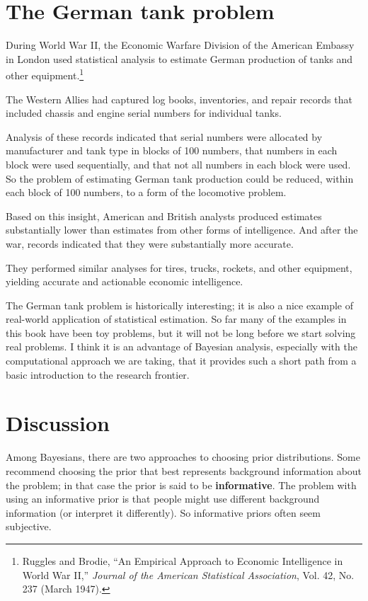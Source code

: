 \documentclass[12pt]{book}
\theoremstyle{exercise}
\begin{document}
\section{The German tank problem}

During World War II, the Economic Warfare Division of the American
Embassy in London used statistical analysis to estimate German
production of tanks and other equipment.\footnote{Ruggles and Brodie,
  ``An Empirical Approach to Economic Intelligence in World War II,''
  {\em Journal of the American Statistical Association}, Vol. 42,
  No. 237 (March 1947).}

The Western Allies had captured log books, inventories, and repair
records that included chassis and engine serial numbers for individual
tanks.

Analysis of these records indicated that serial numbers were allocated
by manufacturer and tank type in blocks of 100 numbers, that numbers
in each block were used sequentially, and that not all numbers in each
block were used.  So the problem of estimating German tank production
could be reduced, within each block of 100 numbers, to a form of the
locomotive problem.

Based on this insight, American and British analysts produced
estimates substantially lower than estimates from other forms
of intelligence.  And after the war, records indicated that they were
substantially more accurate.

They performed similar analyses for tires, trucks, rockets, and other
equipment, yielding accurate and actionable economic intelligence.

The German tank problem is historically interesting; it is also a nice
example of real-world application of statistical estimation.  So far
many of the examples in this book have been toy problems, but it will
not be long before we start solving real problems.  I think it is an
advantage of Bayesian analysis, especially with the computational
approach we are taking, that it provides such a short path from a
basic introduction to the research frontier.


\section{Discussion}

Among Bayesians, there are two approaches to choosing prior
distributions.  Some recommend choosing the prior that best represents
background information about the problem; in that case the prior
is said to be {\bf informative}.  The problem with using an informative
prior is that people might use different background information (or
interpret it differently).  So informative priors often seem subjective.
\end{document}
